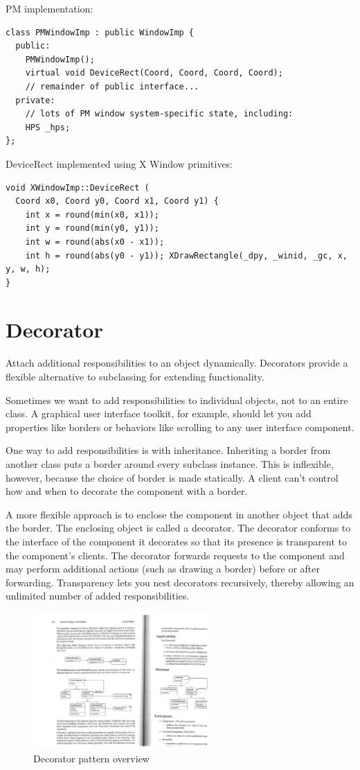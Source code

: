 \documentclass[11pt]{report}
\begin{document}
PM implementation:
\begin{lstlisting}
class PMWindowImp : public WindowImp {
  public:
    PMWindowImp();
    virtual void DeviceRect(Coord, Coord, Coord, Coord);
    // remainder of public interface...
  private:
    // lots of PM window system-specific state, including:
    HPS _hps; 
};
\end{lstlisting}

DeviceRect implemented using X Window primitives:
\begin{lstlisting}
void XWindowImp::DeviceRect (
  Coord x0, Coord y0, Coord x1, Coord y1) {
    int x = round(min(x0, x1));
    int y = round(min(y0, y1));
    int w = round(abs(x0 - x1));
    int h = round(abs(y0 - y1)); XDrawRectangle(_dpy, _winid, _gc, x, y, w, h);
}
\end{lstlisting}

\section{Decorator}

Attach additional responsibilities to an object dynamically. Decorators provide 
a flexible alternative to subclassing for extending functionality.

Sometimes we want to add responsibilities to individual objects, not to an entire class. 
A graphical user interface toolkit, for example, should let you add properties like 
borders or behaviors like scrolling to any user interface component.

One way to add responsibilities is with inheritance. Inheriting a border from another 
class puts a border around every subclass instance. This is inflexible, however, because the choice of border is made statically. A client can't control how and when to decorate the component with a border.

A more flexible approach is to enclose the component in another object that adds the border. 
The enclosing object is called a decorator. The decorator conforms to the interface of the component 
it decorates so that its presence is transparent to the component's clients. 
The decorator forwards requests to the component and may perform additional actions 
(such as drawing a border) before or after forwarding. 
Transparency lets you nest decorators recursively, thereby allowing an unlimited number of added responsibilities.

\begin{figure}
\includegraphics[width=0.6\textwidth]{deco-1.pdf}
\caption{Decorator pattern overview}
\end{figure}
\end{document}
